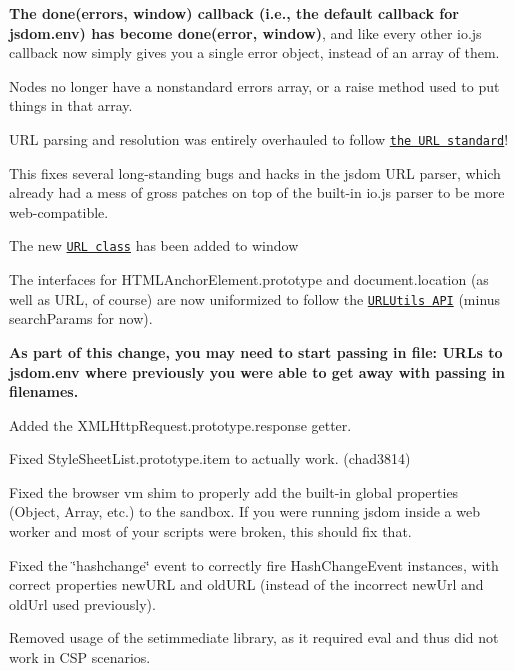 \begin{DoxyItemize}
\begin{DoxyItemize}
\begin{DoxyItemize}
\item {\bfseries The {\ttfamily done(errors, window)} callback (i.\+e., the default callback for {\ttfamily jsdom.\+env}) has become {\ttfamily done(error, window)}}, and like every other io.\+js callback now simply gives you a single error object, instead of an array of them.
\end{DoxyItemize}
\item Nodes no longer have a nonstandard {\ttfamily errors} array, or a {\ttfamily raise} method used to put things in that array.
\end{DoxyItemize}
\item U\+RL parsing and resolution was entirely overhauled to follow \href{http://url.spec.whatwg.org/}{\tt the U\+RL standard}!
\begin{DoxyItemize}
\item This fixes several long-\/standing bugs and hacks in the jsdom U\+RL parser, which already had a mess of gross patches on top of the built-\/in io.\+js parser to be more web-\/compatible.
\item The new \href{https://url.spec.whatwg.org/#url}{\tt {\ttfamily U\+RL} class} has been added to {\ttfamily window}
\item The interfaces for {\ttfamily H\+T\+M\+L\+Anchor\+Element.\+prototype} and {\ttfamily document.\+location} (as well as {\ttfamily U\+RL}, of course) are now uniformized to follow the \href{https://url.spec.whatwg.org/#api}{\tt {\ttfamily U\+R\+L\+Utils} A\+PI} (minus {\ttfamily search\+Params} for now).
\item {\bfseries As part of this change, you may need to start passing in {\ttfamily file\+:} U\+R\+Ls to {\ttfamily jsdom.\+env} where previously you were able to get away with passing in filenames.}
\end{DoxyItemize}
\item Added the {\ttfamily X\+M\+L\+Http\+Request.\+prototype.\+response} getter.
\item Fixed {\ttfamily Style\+Sheet\+List.\+prototype.\+item} to actually work. (chad3814)
\item Fixed the browser {\ttfamily vm} shim to properly add the built-\/in global properties ({\ttfamily Object}, {\ttfamily Array}, etc.) to the sandbox. If you were running jsdom inside a web worker and most of your scripts were broken, this should fix that.
\item Fixed the {\ttfamily \char`\"{}hashchange\char`\"{}} event to correctly fire {\ttfamily Hash\+Change\+Event} instances, with correct properties {\ttfamily new\+U\+RL} and {\ttfamily old\+U\+RL} (instead of the incorrect {\ttfamily new\+Url} and {\ttfamily old\+Url} used previously).
\item Removed usage of the setimmediate library, as it required {\ttfamily eval} and thus did not work in C\+SP scenarios.
\end{DoxyItemize}

